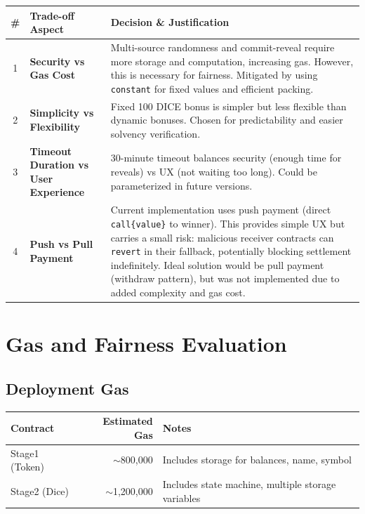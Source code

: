 \documentclass[10pt,a4paper]{article}
\begin{document}
\begin{table}[h]
\centering
\begin{tabularx}{\textwidth}{c X X}
\toprule
\textbf{\#} & \textbf{Trade-off Aspect} & \textbf{Decision \& Justification} \\
\midrule
1 & \textbf{Security vs Gas Cost} & Multi-source randomness and commit-reveal require more storage and computation, increasing gas. However, this is necessary for fairness. Mitigated by using \texttt{constant} for fixed values and efficient packing. \\
2 & \textbf{Simplicity vs Flexibility} & Fixed 100 DICE bonus is simpler but less flexible than dynamic bonuses. Chosen for predictability and easier solvency verification. \\
3 & \textbf{Timeout Duration vs User Experience} & 30-minute timeout balances security (enough time for reveals) vs UX (not waiting too long). Could be parameterized in future versions. \\
4 & \textbf{Push vs Pull Payment} & Current implementation uses push payment (direct \texttt{call\{value\}} to winner). This provides simple UX but carries a small risk: malicious receiver contracts can \texttt{revert} in their fallback, potentially blocking settlement indefinitely. Ideal solution would be pull payment (withdraw pattern), but was not implemented due to added complexity and gas cost. \\
\bottomrule
\end{tabularx}
\end{table}

\section{Gas and Fairness Evaluation}

\subsection*{Deployment Gas}

\begin{table}[!htbp]
\centering
\begin{tabularx}{\textwidth}{X r X}
\toprule
\textbf{Contract} & \textbf{Estimated Gas} & \textbf{Notes} \\
\midrule
Stage1 (Token) & $\sim$800,000 & Includes storage for balances, name, symbol \\
Stage2 (Dice) & $\sim$1,200,000 & Includes state machine, multiple storage variables \\
\bottomrule
\end{tabularx}
\end{table}
\end{document}
